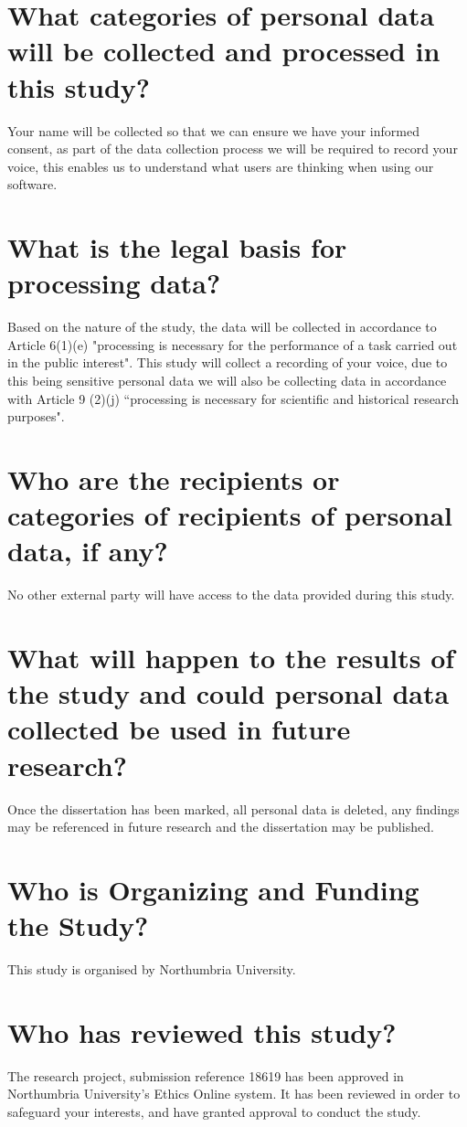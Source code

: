 \section{What categories of personal data will be collected and processed in this study?}
Your name will be collected so that we can ensure we have your informed consent, as part of the data collection process we will be required to record your voice, this enables us to understand what users are thinking when using our software. 
\section{What is the legal basis for processing data?}
Based on the nature of the study, the data will be collected in accordance to Article 6(1)(e) "processing is necessary for the performance of a task carried out in the public interest". This study will collect a recording of your voice, due to this being sensitive personal data we will also be collecting data in accordance with Article 9 (2)(j) “processing is necessary for scientific and historical research purposes".
\section{Who are the recipients or categories of recipients of personal data, if any?}
No other external party will have access to the data provided during this study.
\section{What will happen to the results of the study and could personal data collected be used in future research?}
Once the dissertation has been marked, all personal data is deleted, any findings may be referenced in future research and the dissertation may be published.
\section{Who is Organizing and Funding the Study?}
This study is organised by Northumbria University. 
\section{Who has reviewed this study?}
The research project, submission reference 18619 has been approved in Northumbria University’s Ethics Online system. It has been reviewed in order to safeguard your interests, and have granted approval to conduct the study.
